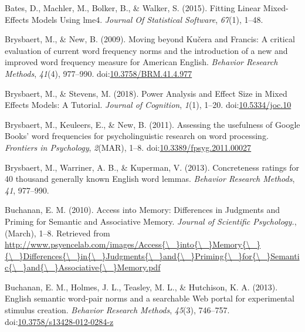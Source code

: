 \documentclass[english,man]{apa6}
\theoremstyle{definition}
\theoremstyle{definition}
\theoremstyle{remark}
\begin{document}
\hypertarget{ref-Bates2015}{}
Bates, D., Machler, M., Bolker, B., \& Walker, S. (2015). Fitting Linear
Mixed-Effects Models Using lme4. \emph{Journal Of Statistical Software},
\emph{67}(1), 1--48.

\hypertarget{ref-Brysbaert2009}{}
Brysbaert, M., \& New, B. (2009). Moving beyond Kučera and Francis: A
critical evaluation of current word frequency norms and the introduction
of a new and improved word frequency measure for American English.
\emph{Behavior Research Methods}, \emph{41}(4), 977--990.
doi:\href{https://doi.org/10.3758/BRM.41.4.977}{10.3758/BRM.41.4.977}

\hypertarget{ref-Brysbaert2018}{}
Brysbaert, M., \& Stevens, M. (2018). Power Analysis and Effect Size in
Mixed Effects Models: A Tutorial. \emph{Journal of Cognition},
\emph{1}(1), 1--20.
doi:\href{https://doi.org/10.5334/joc.10}{10.5334/joc.10}

\hypertarget{ref-Brysbaert2011}{}
Brysbaert, M., Keuleers, E., \& New, B. (2011). Assessing the usefulness
of Google Books' word frequencies for psycholinguistic research on word
processing. \emph{Frontiers in Psychology}, \emph{2}(MAR), 1--8.
doi:\href{https://doi.org/10.3389/fpsyg.2011.00027}{10.3389/fpsyg.2011.00027}

\hypertarget{ref-Brysbaert2013}{}
Brysbaert, M., Warriner, A. B., \& Kuperman, V. (2013). Concreteness
ratings for 40 thousand generally known English word lemmas.
\emph{Behavior Research Methods}, \emph{41}, 977--990.

\hypertarget{ref-Buchanan2010}{}
Buchanan, E. M. (2010). Access into Memory: Differences in Judgments and
Priming for Semantic and Associative Memory. \emph{Journal of Scientific
Psychology.}, (March), 1--8. Retrieved from
\href{http://www.psyencelab.com/images/Access\%7B/_\%7Dinto\%7B/_\%7DMemory\%7B/_\%7D\%7B/_\%7DDifferences\%7B/_\%7Din\%7B/_\%7DJudgments\%7B/_\%7Dand\%7B/_\%7DPriming\%7B/_\%7Dfor\%7B/_\%7DSemantic\%7B/_\%7Dand\%7B/_\%7DAssociative\%7B/_\%7DMemory.pdf}{http://www.psyencelab.com/images/Access\{\textbackslash{}\_\}into\{\textbackslash{}\_\}Memory\{\textbackslash{}\_\}\{\textbackslash{}\_\}Differences\{\textbackslash{}\_\}in\{\textbackslash{}\_\}Judgments\{\textbackslash{}\_\}and\{\textbackslash{}\_\}Priming\{\textbackslash{}\_\}for\{\textbackslash{}\_\}Semantic\{\textbackslash{}\_\}and\{\textbackslash{}\_\}Associative\{\textbackslash{}\_\}Memory.pdf}

\hypertarget{ref-Buchanan2013}{}
Buchanan, E. M., Holmes, J. L., Teasley, M. L., \& Hutchison, K. A.
(2013). English semantic word-pair norms and a searchable Web portal for
experimental stimulus creation. \emph{Behavior Research Methods},
\emph{45}(3), 746--757.
doi:\href{https://doi.org/10.3758/s13428-012-0284-z}{10.3758/s13428-012-0284-z}
\end{document}
